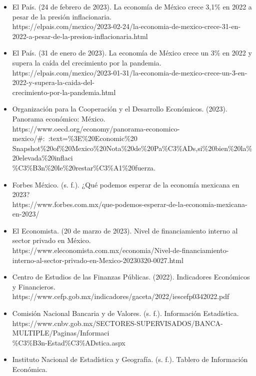 \documentclass{article}
\theoremstyle{mytheoremstyle}
\theoremstyle{mytheoremstyle}
\theoremstyle{myproblemstyle}
\begin{document}
\begin{itemize}
  \item El País. (24 de febrero de 2023). La economía de México crece 3,1\% en 2022 a pesar de la presión inflacionaria.\\ 
  https://elpais.com/mexico/2023-02-24/la-economia-de-mexico-crece-31-en-2022-a-pesar-de-la-presion-inflacionaria.html
  \item El País. (31 de enero de 2023). La economía de México crece un 3\% en 2022 y supera la caída del crecimiento por la pandemia.\\ 
  https://elpais.com/mexico/2023-01-31/la-economia-de-mexico-crece-un-3-en-2022-y-supera-la-caida-del-\\
        crecimiento-por-la-pandemia.html
  \item Organización para la Cooperación y el Desarrollo Económicos. (2023). Panorama económico: México.\\ 
  https://www.oecd.org/economy/panorama-economico-mexico/\#:~:text=\%3E\%20Economic\%20\\
        Snapshot\%20of\%20Mexico\%20Nota\%20de\%20Pa\%C3\%ADs,si\%20bien\%20la\%20elevada\%20inflaci\\
        \%C3\%B3n\%20le\%20restar\%C3\%A1\%20fuerza.
  \item Forbes México. (s. f.). ¿Qué podemos esperar de la economía mexicana en 2023?\\ 
  https://www.forbes.com.mx/que-podemos-esperar-de-la-economia-mexicana-en-2023/
  \item El Economista. (20 de marzo de 2023). Nivel de financiamiento interno al sector privado en México.\\ 
  https://www.eleconomista.com.mx/economia/Nivel-de-financiamiento-interno-al-sector-privado-en-Mexico-20230320-0027.html
  \item Centro de Estudios de las Finanzas Públicas. (2022). Indicadores Económicos y Financieros.\\ 
  https://www.cefp.gob.mx/indicadores/gaceta/2022/iescefp0342022.pdf
  \item Comisión Nacional Bancaria y de Valores. (s. f.). Información Estadística.\\ 
  https://www.cnbv.gob.mx/SECTORES-SUPERVISADOS/BANCA-MULTIPLE/Paginas/Informaci\\
        \%C3\%B3n-Estad\%C3\%ADstica.aspx
  \item Instituto Nacional de Estadística y Geografía. (s. f.). Tablero de Información Económica.\\ 

\end{itemize}
\end{document}
